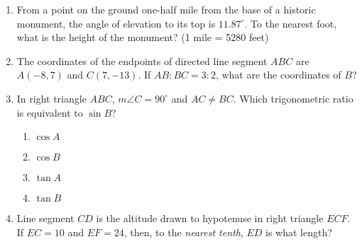 \documentclass[12pt, oneside]{article}
\begin{document}
\begin{enumerate}[itemsep=1.2cm]
\item From a point on the ground one-half mile from the base of a historic monument, the angle of elevation to its top is $11.87^\circ$. To the nearest foot, what is the height of the monument? (1 mile = 5280 feet)

\item The coordinates of the endpoints of directed line segment $ABC$ are $A(-8,7)$ and $C(7,-13)$. If $AB:BC = 3:2$, what are the coordinates of $B$?

\item In right triangle $ABC$, $m\angle C=90^\circ$ and $AC \ne BC$. Which trigonometric ratio is equivalent to $\sin B$?
\begin{multicols}{2}
  \begin{enumerate}
    \item $\cos A$
    \item $\cos B$
    \item $\tan A$
    \item $\tan B$
  \end{enumerate}
\end{multicols}

\item Line segment $CD$ is the altitude drawn to hypotenuse in right
triangle $ECF$. If $EC=10$ and $EF=24$, then, to the \emph{nearest
tenth}, $ED$ is what length?

\end{enumerate}
\end{document}
